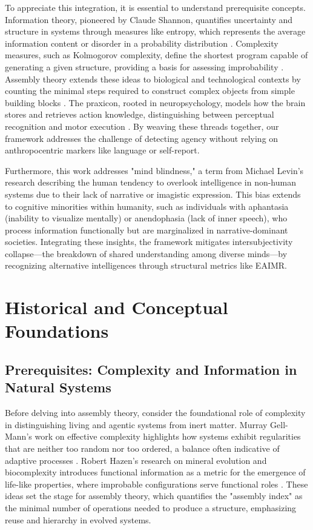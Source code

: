 \documentclass{article}
\begin{document}
To appreciate this integration, it is essential to understand prerequisite concepts. Information theory, pioneered by Claude Shannon, quantifies uncertainty and structure in systems through measures like entropy, which represents the average information content or disorder in a probability distribution \citep{shannon1948}. Complexity measures, such as Kolmogorov complexity, define the shortest program capable of generating a given structure, providing a basis for assessing improbability \citep{kolmogorov1965}. Assembly theory extends these ideas to biological and technological contexts by counting the minimal steps required to construct complex objects from simple building blocks \citep{walker2013}. The praxicon, rooted in neuropsychology, models how the brain stores and retrieves action knowledge, distinguishing between perceptual recognition and motor execution \citep{peigneux2004}. By weaving these threads together, our framework addresses the challenge of detecting agency without relying on anthropocentric markers like language or self-report.

Furthermore, this work addresses "mind blindness," a term from Michael Levin's research describing the human tendency to overlook intelligence in non-human systems due to their lack of narrative or imagistic expression. This bias extends to cognitive minorities within humanity, such as individuals with aphantasia (inability to visualize mentally) or anendophasia (lack of inner speech), who process information functionally but are marginalized in narrative-dominant societies. Integrating these insights, the framework mitigates intersubjectivity collapse—the breakdown of shared understanding among diverse minds—by recognizing alternative intelligences through structural metrics like EAIMR.

\section{Historical and Conceptual Foundations}
\label{sec:foundations}

\subsection{Prerequisites: Complexity and Information in Natural Systems}
Before delving into assembly theory, consider the foundational role of complexity in distinguishing living and agentic systems from inert matter. Murray Gell-Mann's work on effective complexity highlights how systems exhibit regularities that are neither too random nor too ordered, a balance often indicative of adaptive processes \citep{adami2012}. Robert Hazen's research on mineral evolution and biocomplexity introduces functional information as a metric for the emergence of life-like properties, where improbable configurations serve functional roles \citep{hazen2007}. These ideas set the stage for assembly theory, which quantifies the "assembly index" as the minimal number of operations needed to produce a structure, emphasizing reuse and hierarchy in evolved systems.
\end{document}
